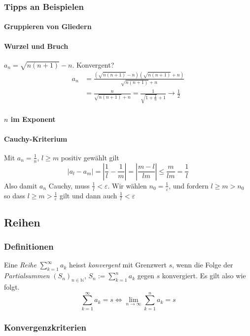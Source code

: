 \documentclass[a4paper, 9pt, DIV=24]{scrartcl}
\newcommand{\N}{\mathbb{N}}
\begin{document}
\subsubsection{Tipps an Beispielen}
\paragraph{Gruppieren von Gliedern}

\paragraph{Wurzel und Bruch}
$a_n=\sqrt{n(n+1)}-n$. Konvergent?
\begin{align*}
a_n &= \frac{\left(\sqrt{n(n+1)}-n\right)\left(\sqrt{n(n+1)}+n\right)}{\sqrt{n(n+1)}+n} \\
    &= \frac{n}{\sqrt{n(n+1)}+n} = \frac{1}{\sqrt{1+\frac{1}{n}}+1} \to \frac{1}{2}
\end{align*}

\paragraph{$n$ im Exponent}

\paragraph{Cauchy-Kriterium}
Mit $a_n = \frac{1}{n}$, $l\geq m$ positiv gewählt gilt 
\[ | a_l - a_m | = \left|\frac{1}{l} - \frac{1}{m}\right| = \left|\frac{m-l}{lm}\right| \leq \frac{m}{lm} = \frac{1}{l} \]
Also damit $a_n$ Cauchy, muss $\tfrac{1}{l}<\varepsilon$. Wir wählen $n_0 = \tfrac{1}{\varepsilon}$, und fordern $l \geq m > n_0$ so dass $l \geq m > \tfrac{1}{\varepsilon}$ gilt und dann auch $\tfrac{1}{l} < \varepsilon$

\subsection{Reihen}
\subsubsection{Definitionen}
Eine \emph{Reihe} $\sum_{k = 1}^\infty a_k$ heisst \emph{konvergent} mit Grenzwert $s$, wenn die Folge der \emph{Partialsummen}
$(S_n)_{n \in \N}$, $S_n := \sum_{k=1}^n a_k$ gegen $s$ konvergiert. Es gilt also wie folgt.
\[ \sum_{k=1}^\infty a_k = s \iff \lim_{n\to\infty} \sum_{k=1}^n a_k = s \]

\subsubsection{Konvergenzkriterien}
\end{document}
